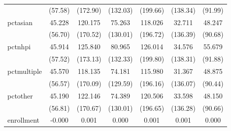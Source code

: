 {\begin{tabular}{l*{6}{c}}
            &                  (57.58)         &                 (172.90)         &                 (132.03)         &                 (199.66)         &                 (138.34)         &                  (91.99)         \\
pctasian    &                   45.228         &                  120.175         &                   75.263         &                  118.026         &                   32.711         &                   48.247         \\
            &                  (56.70)         &                 (170.52)         &                 (130.01)         &                 (196.72)         &                 (136.39)         &                  (90.68)         \\
pctnhpi     &                   45.914         &                  125.840         &                   80.965         &                  126.014         &                   34.576         &                   55.679         \\
            &                  (57.52)         &                 (173.13)         &                 (132.33)         &                 (199.80)         &                 (138.31)         &                  (91.88)         \\
pctmultiple &                   45.570         &                  118.135         &                   74.181         &                  115.980         &                   31.367         &                   48.875         \\
            &                  (56.57)         &                 (170.09)         &                 (129.59)         &                 (196.16)         &                 (136.07)         &                  (90.44)         \\
pctother    &                   45.190         &                  122.146         &                   74.389         &                  120.506         &                   33.598         &                   48.150         \\
            &                  (56.81)         &                 (170.67)         &                 (130.01)         &                 (196.65)         &                 (136.28)         &                  (90.66)         \\
enrollment  &                   -0.000         &                    0.001         &                    0.000         &                    0.001         &                    0.001         &                    0.000         \\

\end{tabular}}
